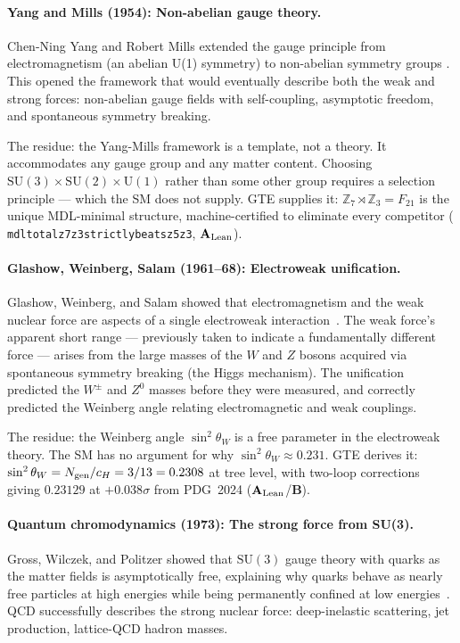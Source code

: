 \documentclass[11pt,openany]{book}
\theoremstyle{remark}
\newcommand{\lean}[1]{%
  \penalty-100
  \begingroup\def\_{\textunderscore\allowbreak}\texttt{#1}\endgroup}
\newcommand{\CatAL}{\ensuremath{\textbf{A}_{\rm Lean}}}
\newcommand{\CatB}{\textbf{B}}
\begin{document}
\paragraph{Yang and Mills (1954): Non-abelian gauge theory.}
Chen-Ning Yang and Robert Mills extended the gauge principle from electromagnetism
(an abelian U(1) symmetry) to non-abelian symmetry groups \cite{YangMills1954}.
This opened the framework that would eventually describe both the weak and strong
forces: non-abelian gauge fields with self-coupling, asymptotic freedom, and
spontaneous symmetry breaking.

The residue: the Yang-Mills framework is a template, not a theory.
It accommodates any gauge group and any matter content.
Choosing $\mathrm{SU}(3)\times\mathrm{SU}(2)\times\mathrm{U}(1)$ rather than some other
group requires a selection principle --- which the SM does not supply.
GTE supplies it: $\mathbb{Z}_7\rtimes\mathbb{Z}_3 = F_{21}$ is the unique MDL-minimal
structure, machine-certified to eliminate every competitor (\lean{mdl\_total\_z7z3\_strictly\_beats\_z5z3},
\CatAL).

\paragraph{Glashow, Weinberg, Salam (1961--68): Electroweak unification.}
Glashow, Weinberg, and Salam showed that electromagnetism and the weak nuclear force
are aspects of a single electroweak interaction~\cite{Glashow1961,Weinberg1967,Salam1968}.
The weak force's apparent short range --- previously taken to indicate a fundamentally
different force --- arises from the large masses of the $W$ and $Z$ bosons acquired
via spontaneous symmetry breaking (the Higgs mechanism).
The unification predicted the $W^\pm$ and $Z^0$ masses before they were measured,
and correctly predicted the Weinberg angle relating electromagnetic and weak couplings.

The residue: the Weinberg angle $\sin^2\theta_W$ is a free parameter in the electroweak
theory.
The SM has no argument for why $\sin^2\theta_W \approx 0.231$.
GTE derives it: $\sin^2\theta_W = N_{\rm gen}/c_H = 3/13 = 0.2308$ at tree level,
with two-loop corrections giving $0.23129$ at $+0.038\sigma$ from PDG~2024 (\CatAL/\CatB).

\paragraph{Quantum chromodynamics (1973): The strong force from SU(3).}
Gross, Wilczek, and Politzer showed that $\mathrm{SU}(3)$ gauge theory with quarks as
the matter fields is asymptotically free, explaining why quarks behave as nearly
free particles at high energies while being permanently confined at low
energies~\cite{GrossWilczek1973,Politzer1973}.
QCD successfully describes the strong nuclear force: deep-inelastic scattering, jet
production, lattice-QCD hadron masses.
\end{document}
